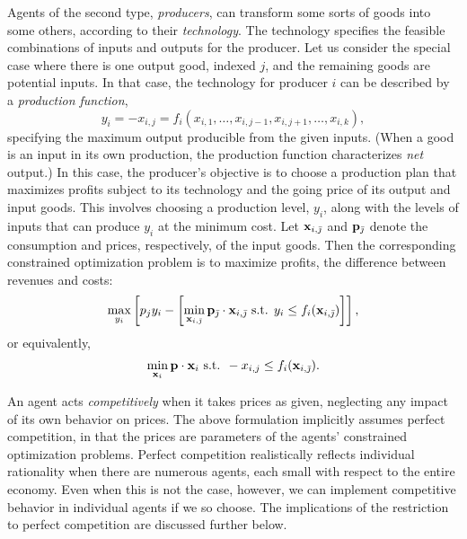 Agents of the second type, {\em producers}, can transform some sorts
of goods into some others, according to their {\em technology}.  The 
technology specifies the feasible combinations of inputs and outputs for 
the producer.  Let us consider the special case where there is one output
good, indexed $j$, and the remaining goods are potential inputs.  In that 
case, the technology for producer $i$ can be described by a {\em production 
function},
\begin{displaymath}
y_i=-x_{i,j}=f_i(x_{i,1},\ldots,x_{i,j-1},x_{i,j+1},\ldots,x_{i,k}),
\end{displaymath}
specifying the maximum output producible from the given inputs.
(When a good is an input in its own production, the production 
function characterizes {\em net\/} output.)  In this 
case, the producer's objective is to choose a production plan that 
maximizes profits subject to its technology and the going price of its 
output and input goods.  This involves choosing a production level, 
$y_i$, along with the levels of inputs that can 
produce $y_i$ at the minimum cost.  Let ${\bf x}_{i,\bar{\jmath}}$ and
${\bf p}_{\bar{\jmath}}$ denote the consumption and prices, respectively,
of the input goods.
Then the corresponding constrained
optimization problem is to maximize profits, the difference between 
revenues and costs:
\begin{displaymath}
\max_{y_i} \left[ p_j y_i -
              \left[ \min_{{\bf x}_{i,\bar{\jmath}}} 
                      {\bf p}_{\bar{\jmath}}\cdot{\bf x}_{i,\bar{\jmath}}
\mbox{ s.t. }
y_i \leq f_i({\bf x}_{i,\bar{\jmath}})\right] \right] ,
\end{displaymath}
or equivalently,
\begin{equation}\label{e-producer}
\min_{{\bf x}_i}  {\bf p}\cdot{\bf x}_{i}
\mbox{ s.t. }
-x_{i,j} \leq f_i({\bf x}_{i,\bar{\jmath}}).
\end{equation}

An agent acts {\em competitively\/} when it takes prices as given, neglecting any
impact of its own behavior on prices.  The above 
formulation implicitly assumes perfect competition, in that the prices 
are parameters of the agents' constrained optimization problems.
Perfect competition realistically reflects individual rationality when there
are numerous agents, each small with respect to the entire economy. 
Even when this is not the case, however, we can implement competitive 
behavior in individual agents if we so choose.  The implications of the 
restriction to perfect competition are discussed further below.


